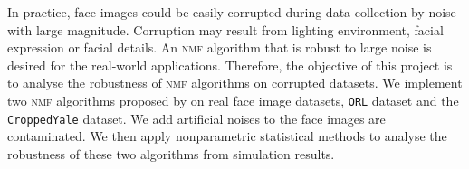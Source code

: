 In practice, face images could be easily corrupted during data collection by noise with large magnitude. Corruption may result from lighting environment, facial expression or facial details. An \textsc{nmf} algorithm that is robust to large noise is desired for the real-world applications. Therefore, the objective of this project is to analyse the robustness of \textsc{nmf} algorithms on corrupted datasets. We implement two \textsc{nmf} algorithms proposed by \citet{lee2001algorithms} on real face image datasets, \texttt{ORL} dataset and the \texttt{CroppedYale} dataset. We add artificial noises to the face images are contaminated. We then apply nonparametric statistical methods to analyse the robustness of these two algorithms from simulation results.

